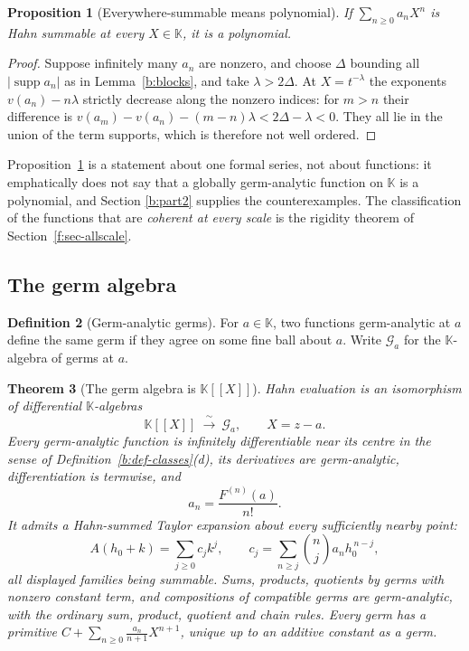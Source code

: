 \documentclass[11pt,a4paper]{article}
\numberwithin{equation}{section}
\newtheorem{theorem}{Theorem}[section]
\newtheorem{proposition}[theorem]{Proposition}
\theoremstyle{definition}
\newtheorem{definition}[theorem]{Definition}
\theoremstyle{remark}
\theoremstyle{plain}
\newcommand{\K}{\mathbb K}
\DeclareMathOperator{\supp}{supp}
\newcommand{\tm}{t}
\newcommand{\abs}[1]{\lvert #1\rvert}
\begin{document}
\begin{proposition}[Everywhere-summable means polynomial]
\label{b:globalseries}
If $\sum_{n\ge0}a_nX^{n}$ is Hahn summable at \emph{every} $X\in\K$, it is
a polynomial.
\end{proposition}

\begin{proof}
Suppose infinitely many $a_n$ are nonzero, and choose $\Delta$ bounding
all $\abs{\supp a_n}$ as in Lemma~\ref{b:blocks}, and take
$\lambda>2\Delta$. At $X=\tm^{-\lambda}$ the exponents
$v(a_n)-n\lambda$ strictly decrease along the nonzero indices: for
$m>n$ their difference is
$v(a_m)-v(a_n)-(m-n)\lambda<2\Delta-\lambda<0$.
They all lie in the union of the term supports, which is therefore
not well ordered.
\end{proof}

Proposition~\ref{b:globalseries} is a statement about one formal series,
not about functions: it emphatically does not say that a globally
germ-analytic function on $\K$ is a polynomial, and Section \ref{b:part2}
supplies the counterexamples. The classification of the functions that are
\emph{coherent at every scale} is the rigidity theorem of Section~\ref{f:sec-allscale}.

\subsection{The germ algebra}

\begin{definition}[Germ-analytic germs]
\label{b:def-germ}
For $a\in\K$, two functions germ-analytic at $a$ define the same germ if
they agree on some fine ball about $a$. Write $\mathcal G_a$ for the
$\K$-algebra of germs at $a$.
\end{definition}

\begin{theorem}[{The germ algebra is $\K[[X]]$}]
\label{b:germalgebra}
Hahn evaluation is an isomorphism of differential $\K$-algebras
\[
 \K[[X]]\ \xrightarrow{\ \sim\ }\ \mathcal G_a,
 \qquad X=z-a .
\]
Every germ-analytic function is infinitely differentiable near its centre
in the sense of Definition~\ref{b:def-classes}(d), its derivatives are
germ-analytic, differentiation is termwise, and
\[
 a_n=\frac{F^{(n)}(a)}{n!}.
\]
It admits a Hahn-summed Taylor expansion about every sufficiently nearby
point:
\[
 A(h_0+k)=\sum_{j\ge0}c_jk^{j},
 \qquad c_j=\sum_{n\ge j}\binom nj a_nh_0^{\,n-j},
\]
all displayed families being summable. Sums, products, quotients by germs
with nonzero constant term, and compositions of compatible germs are
germ-analytic, with the ordinary sum, product, quotient and chain rules.
Every germ has a primitive $C+\sum_{n\ge0}\frac{a_n}{n+1}X^{n+1}$, unique
up to an additive constant \emph{as a germ}.
\end{theorem}
\end{document}
